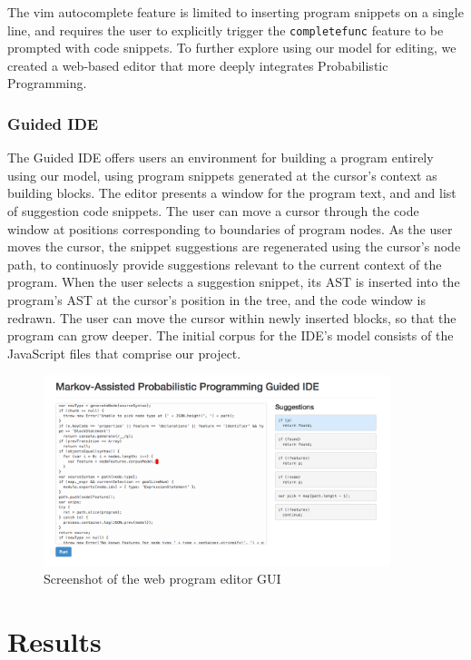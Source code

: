 \documentclass{article}
\begin{document}
The vim autocomplete feature is limited to inserting program snippets on a single
line, and requires the user to explicitly trigger the \texttt{completefunc}
feature to be prompted with code snippets. To further explore using our model
for editing, we created a web-based editor that more deeply integrates Probabilistic
Programming.

\clearpage
\subsubsection{Guided IDE}

The Guided IDE offers users an environment for building a program entirely using
our model, using program snippets generated at the cursor's context as building
blocks. The editor presents a window for the program text, and and list of
suggestion code snippets. The user can move a cursor through the code window at
positions corresponding to boundaries of program nodes. As the user moves the
cursor, the snippet suggestions are regenerated using the cursor's node path, to
continuosly provide suggestions relevant to the current context of the program. When the
user selects a suggestion snippet, its AST is inserted into the program's AST at
the cursor's position in the tree, and the code window is redrawn. The user can
move the cursor within newly inserted blocks, so that the program can grow
deeper. The initial corpus for the IDE's model consists of the JavaScript files
that comprise our project.

\begin{figure}[h]
  \centering
  \includegraphics[width=0.90\textwidth]{screenshot}
  \caption{Screenshot of the web program editor GUI} \label{fig:screenshot}
\end{figure}


\section{Results}
\end{document}
